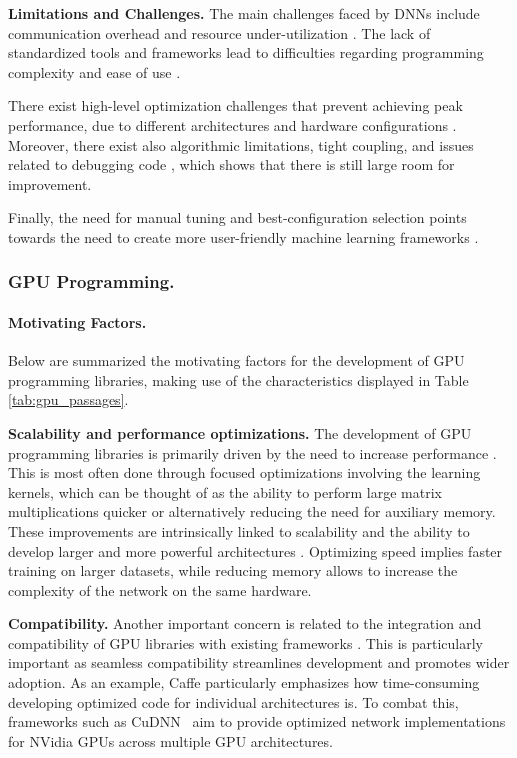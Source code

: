 \textbf{Limitations and Challenges.}
The main challenges faced by DNNs include communication overhead and resource under-utilization
. The lack of standardized tools and frameworks lead
to difficulties regarding programming complexity and ease of use .

There exist high-level optimization challenges that prevent achieving peak performance, due to
different architectures and hardware configurations . Moreover, there exist
also algorithmic limitations, tight coupling, and issues related to debugging code
, which shows that there is still large room for improvement.

Finally, the need for manual tuning and best-configuration selection points towards the need to
create more user-friendly machine learning frameworks .

\subsubsection{GPU Programming.}
\paragraph{Motivating Factors.}
Below are summarized the motivating factors for the development of GPU programming libraries,
making use of the characteristics displayed in Table \ref{tab:gpu_passages}.

\textbf{Scalability and performance optimizations.}
The development of GPU programming libraries is primarily driven by the need to increase
performance . This is most often done through focused %
optimizations involving the learning kernels, which can be thought of as the ability to perform
large matrix multiplications quicker or alternatively reducing the need for auxiliary memory. These
improvements are intrinsically linked to scalability and the ability to develop larger and more
powerful architectures . Optimizing speed implies faster training
on larger datasets, while reducing memory allows to increase the complexity of the network on
the same hardware.

\textbf{Compatibility.}
Another important concern is related to the integration and compatibility of GPU libraries with
existing frameworks . This is particularly important as seamless
compatibility streamlines development and promotes wider adoption. As an example, Caffe \cite{Jia.EtAl_2014a}
particularly emphasizes how time-consuming developing optimized code for individual architectures is.
To combat this, frameworks such as CuDNN~\cite{chetlur_cudnn_2014} aim to provide optimized network
implementations for NVidia GPUs across multiple GPU architectures.

